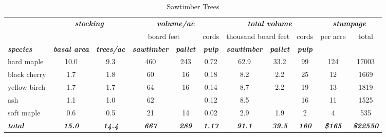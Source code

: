 \documentclass[landscape]{article}
\begin{document}
\begin{table}[H]

\caption{\label{tab:unnamed-chunk-61}Sawtimber Trees}
\fontsize{10}{12}\selectfont
\begin{tabular}[t]{lcccccccccc}
\toprule
\multicolumn{1}{c}{\em{\textbf{ }}} & \multicolumn{2}{c}{\em{\textbf{stocking}}} & \multicolumn{3}{c}{\em{\textbf{volume/ac }}} & \multicolumn{3}{c}{\em{\textbf{total volume}}} & \multicolumn{2}{c}{\em{\textbf{stumpage}}} \\
\cmidrule(l{3pt}r{3pt}){2-3} \cmidrule(l{3pt}r{3pt}){4-6} \cmidrule(l{3pt}r{3pt}){7-9} \cmidrule(l{3pt}r{3pt}){10-11}
\multicolumn{3}{c}{ } & \multicolumn{2}{c}{board feet} & \multicolumn{1}{c}{cords} & \multicolumn{2}{c}{thousand board feet} & \multicolumn{1}{c}{cords} & \multicolumn{1}{c}{per acre} & \multicolumn{1}{c}{total} \\
\cmidrule(l{3pt}r{3pt}){4-5} \cmidrule(l{3pt}r{3pt}){6-6} \cmidrule(l{3pt}r{3pt}){7-8} \cmidrule(l{3pt}r{3pt}){9-9} \cmidrule(l{3pt}r{3pt}){10-10} \cmidrule(l{3pt}r{3pt}){11-11}
\rowcolor[HTML]{DCDCDC}  \em{\textbf{species}} & \em{\textbf{basal area}} & \em{\textbf{trees/ac}} & \em{\textbf{sawtimber}} & \em{\textbf{pallet}} & \em{\textbf{pulp}} & \em{\textbf{sawtimber}} & \em{\textbf{pallet}} & \em{\textbf{pulp}} & \em{\textbf{ }} & \em{\textbf{ }}\\
\midrule
\rowcolor{gray!6}  hard maple & 10.0 & 9.3 & 460 & 243 & 0.72 & 62.9 & 33.2 & 99 & 124 & 17003\\
 
black cherry & 1.7 & 1.8 & 60 & 16 & 0.18 & 8.2 & 2.2 & 25 & 12 & 1669\\
 
\rowcolor{gray!6}  yellow birch & 1.7 & 1.7 & 64 & 16 & 0.14 & 8.7 & 2.2 & 19 & 13 & 1819\\
 
ash & 1.1 & 1.0 & 62 &  & 0.12 & 8.5 &  & 16 & 11 & 1525\\
 
\rowcolor{gray!6}  soft maple & 0.6 & 0.5 & 21 & 14 & 0.02 & 2.9 & 1.9 & 2 & 4 & 535\\
 
\rowcolor[HTML]{DCDCDC}  \em{\textbf{total}} & \em{\textbf{15.0}} & \em{\textbf{14.4}} & \em{\textbf{667}} & \em{\textbf{289}} & \em{\textbf{1.17}} & \em{\textbf{91.1}} & \em{\textbf{39.5}} & \em{\textbf{160}} & \em{\textbf{\$165}} & \em{\textbf{\$22550}}\\
\bottomrule
\end{tabular}
\end{table}
\end{document}
